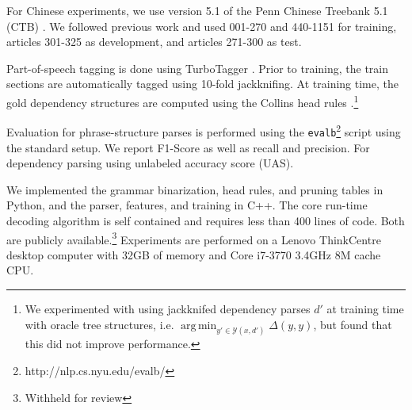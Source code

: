 \documentclass[11pt,letterpaper]{article}
\DeclareMathOperator*{\argmin}{arg\,min}
\begin{document}
For Chinese experiments, we use version 5.1 of the Penn  Chinese Treebank 5.1 (CTB) \cite{xue2005penn}. We followed previous work and used
001-270 and 440-1151 for training, articles
301-325 as development, and articles
271-300 as test.

Part-of-speech tagging is done using TurboTagger
\cite{martins2013turning}. Prior to training, the train sections are
automatically tagged using 10-fold jackknifing. At training time, the
gold dependency structures are computed using the Collins head rules
\cite{collins2003head}.\footnote{ We experimented with using
  jackknifed dependency parses $d'$ at training time with oracle tree
  structures, i.e. $\argmin_{y' \in \mathcal{Y}(x, d')} \Delta(y, y)$,
  but found that this did not improve performance.}

Evaluation for phrase-structure parses is performed using the
\texttt{evalb}\footnote{http://nlp.cs.nyu.edu/evalb/} script using the
standard setup. We report F1-Score as well as recall and
precision. For dependency parsing using unlabeled accuracy score
(UAS).

We implemented the grammar binarization, head rules, and pruning
tables in Python, and the parser, features, and training in C++. The
core run-time decoding algorithm is self contained and requires less
than 400 lines of code. Both are publicly available.\footnote{Withheld
  for review} Experiments are performed on a Lenovo ThinkCentre desktop computer
with 32GB of memory and  Core i7-3770 3.4GHz 8M cache CPU.










\end{document}
